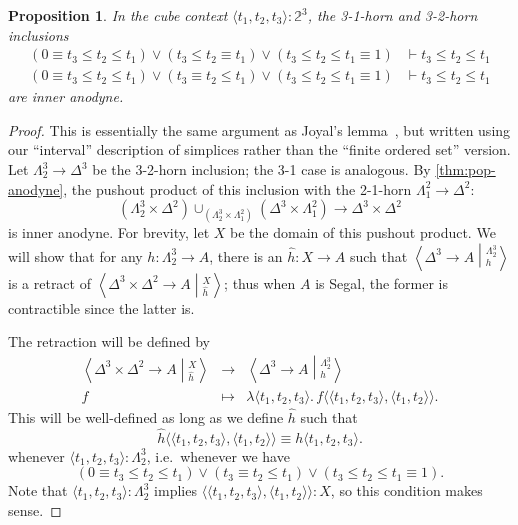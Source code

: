 \documentclass{amsart}
\theoremstyle{plain}
\newtheorem{prop}[thm]{Proposition}
\theoremstyle{definition}
\theoremstyle{remark}
\numberwithin{equation}{section}
\newcommand{\ndexten}[4]{\left\langle #1 \to #2 \middle|^{#3}_{#4}\right\rangle}
\newcommand{\jdeq}{\equiv}
\newcommand{\types}{\vdash}
\newcommand{\pair}[1]{\langle #1\rangle}
\newcommand{\lam}[1]{\lambda #1.\,}
\newcommand{\two}{\mathbb{2}}
\begin{document}
\begin{prop}\label{thm:3horn-anodyne}
  In the cube context $    \pair{t_1,t_2,t_3}:\two^3$, the 3-1-horn and 3-2-horn inclusions
  \begin{align*}
(0\jdeq t_3\le t_2\le t_1) \lor (t_3\le t_2\jdeq t_1) \lor (t_3\le t_2\le t_1\jdeq 1) &\types t_3\le t_2\le t_1\\
 (0\jdeq t_3\le t_2\le t_1) \lor (t_3\jdeq t_2\le t_1) \lor (t_3\le t_2\le t_1\jdeq 1) &\types t_3\le t_2\le t_1
  \end{align*}
  are inner anodyne.
\end{prop}
\begin{proof}
  This is essentially the same argument as Joyal's lemma~\cite[2.3.2.1]{HTT}, but written using our ``interval'' description of simplices rather than the ``finite ordered set'' version.
  Let $\Lambda^3_2 \to \Delta^3$ be the 3-2-horn inclusion; the 3-1 case is analogous.
  By \cref{thm:pop-anodyne}, the pushout product of this inclusion with the 2-1-horn $\Lambda^2_1\to\Delta^2$:
  \[ (\Lambda^3_2 \times \Delta^2) \cup_{(\Lambda^3_2 \times \Lambda^2_1)} (\Delta^3\times\Lambda^2_1) \longrightarrow \Delta^3\times\Delta^2 \]
  is inner anodyne.
  For brevity, let $X$ be the domain of this pushout product.
  We will show that for any $h:\Lambda^3_2 \to A$, there is an $\hat h:X\to A$ such that $\ndexten{\Delta^3}{A}{\Lambda^3_2}{h}$ is a retract of $\ndexten{\Delta^3\times\Delta^2}{A}{X}{\hat h}$; thus when $A$ is Segal, the former is contractible since the latter is.

  The retraction will be defined by
  \[
  \begin{array}{ccc}
    \ndexten{\Delta^3\times\Delta^2}{A}{X}{\hat h} & \to &\ndexten{\Delta^3}{A}{\Lambda^3_2}{h} \\
    f & \mapsto & \lam{\pair{t_1,t_2,t_3}} f\pair{\pair{t_1,t_2,t_3},\pair{t_1,t_2}}.
  \end{array}
  \]
  This will be well-defined as long as we define $\hat h$ such that
  \[ \hat h\pair{\pair{t_1,t_2,t_3},\pair{t_1,t_2}} \jdeq h\pair{t_1,t_2,t_3}. \]
  whenever $\pair{t_1,t_2,t_3} : \Lambda^3_2$, i.e.\ whenever we have
  \[ (0\jdeq t_3\le t_2\le t_1) \lor (t_3\jdeq t_2\le t_1) \lor (t_3\le t_2\le t_1\jdeq 1). \]
  Note that $\pair{t_1,t_2,t_3} : \Lambda^3_2$ implies $\pair{\pair{t_1,t_2,t_3},\pair{t_1,t_2}}:X$, so this condition makes sense.


\end{proof}
\end{document}
